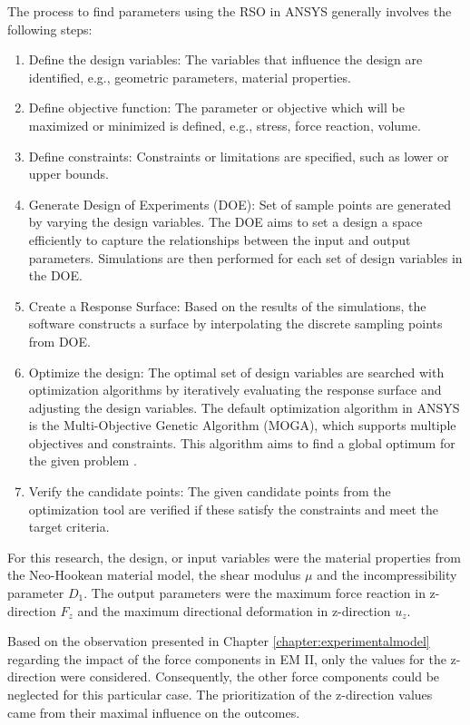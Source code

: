 The process to find parameters using the RSO in ANSYS generally involves the following steps:
\begin{enumerate}
    \item Define the design variables: The variables that influence the design are identified, e.g., geometric parameters, material properties.
    \item Define objective function: The parameter or objective which will be maximized or minimized is defined, e.g., stress, force reaction, volume. 
    \item Define constraints: Constraints or limitations are specified, such as lower or upper bounds.
    \item Generate Design of Experiments (DOE): Set of sample points are generated by varying the design variables. The DOE aims to set a design a space efficiently to capture the relationships between the input and output parameters. Simulations are then performed for each set of design variables in the DOE.  
    \item Create a Response Surface: Based on the results of the simulations, the software constructs a surface by interpolating the discrete sampling points from DOE.
    \item Optimize the design: The optimal set of design variables are searched with optimization algorithms by iteratively evaluating the response surface and adjusting the design variables. The default optimization algorithm in ANSYS is the Multi-Objective Genetic Algorithm (MOGA), which supports multiple objectives and constraints. This algorithm aims to find a global optimum for the given problem \cite{Grebenisan2017}.
    \item Verify the candidate points: The given candidate points from the optimization tool are verified if these satisfy the constraints and meet the target criteria.
\end{enumerate}

For this research, the design, or input variables were the material properties from the Neo-Hookean 
material model, the shear modulus $\mu$ and the incompressibility parameter $D_1$. The output parameters 
were the maximum force reaction in z-direction $F_z$ and the maximum directional deformation in z-direction $u_z$.

Based on the observation presented in Chapter \ref{chapter:experimentalmodel} regarding the impact of the force 
components in EM II, only the values for the z-direction were considered. Consequently, the other force 
components could be neglected for this particular case. The prioritization of the z-direction values came from 
their maximal influence on the outcomes.

